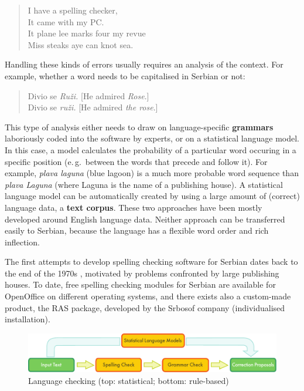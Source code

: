 {\begin{multicols}{2}
\begin{quote}
 I have a spelling checker, \\
 It came with my PC. \\
 It plane lee marks four my revue \\
 Miss steaks aye can knot sea. 
\end{quote}

Handling these kinds of errors usually requires an analysis of the context. For example, whether a word needs to be capitalised in Serbian or not:

\begin{quote}
Divio se \textit{Ruži.} [He admired \textit{Rose}.]\\
Divio se \textit{ruži.} [He admired \textit{the rose}.]
\end{quote}

This type of analysis either needs to draw on language-specific \textbf{grammars} laboriously coded into the software by experts, or on a statistical language model. In this case, a model calculates the probability of a particular word occuring in a specific position (e.\,g.~between the words that precede and follow it). For example, \textit{plava laguna} (blue lagoon) is a much more probable word sequence than \textit{plava Laguna} (where Laguna is the name of a publishing house). A statistical language model can be automatically created by using a large amount of (correct) language data, a \textbf{text corpus}. These two approaches have been mostly developed around English language data. Neither approach can be transferred easily to Serbian, because the language has a flexible word order and rich inflection.


The first attempts to develop spelling checking software for Serbian dates back to the end of the 1970s \cite{UROSEVIC}, motivated by problems confronted by large publishing houses. To date, free spelling checking modules for Serbian are available for OpenOffice \cite{OpenOffice} on different operating systems, and there exists also a custom-made product, the RAS package, \cite{RASPROG} developed by the Srbosof company (individualised installation).  
 
\begin{figure}[htb]
  \center
  \includegraphics[width=\textwidth]{../_media/english/language_checking}
  \caption{Language checking (top: statistical; bottom: rule-based)}
  \label{fig:langcheckingaarch_en}
\end{figure}


\end{multicols}}
